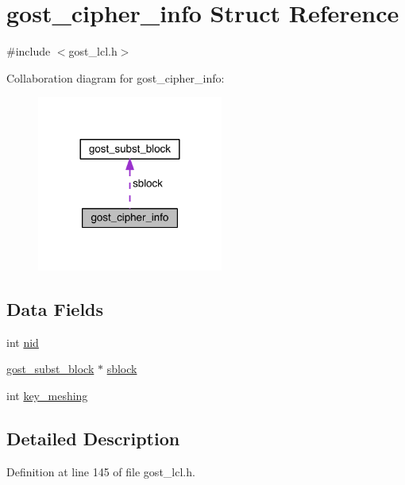 \hypertarget{structgost__cipher__info}{}\section{gost\+\_\+cipher\+\_\+info Struct Reference}
\label{structgost__cipher__info}


{\ttfamily \#include $<$gost\+\_\+lcl.\+h$>$}



Collaboration diagram for gost\+\_\+cipher\+\_\+info\+:\nopagebreak
\begin{figure}[H]
\begin{center}
\leavevmode
\includegraphics[width=173pt]{structgost__cipher__info__coll__graph}
\end{center}
\end{figure}
\subsection*{Data Fields}
\begin{DoxyCompactItemize}
\item 
int \hyperlink{structgost__cipher__info_a7235ef62e89328f5155846dc59c6fc37}{nid}
\item 
\hyperlink{structgost__subst__block}{gost\+\_\+subst\+\_\+block} $\ast$ \hyperlink{structgost__cipher__info_a65a9a4736866b0afb07e3e6a093054d8}{sblock}
\item 
int \hyperlink{structgost__cipher__info_a0d26c1455c49156afaa4c8194010ed56}{key\+\_\+meshing}
\end{DoxyCompactItemize}


\subsection{Detailed Description}


Definition at line 145 of file gost\+\_\+lcl.\+h.



